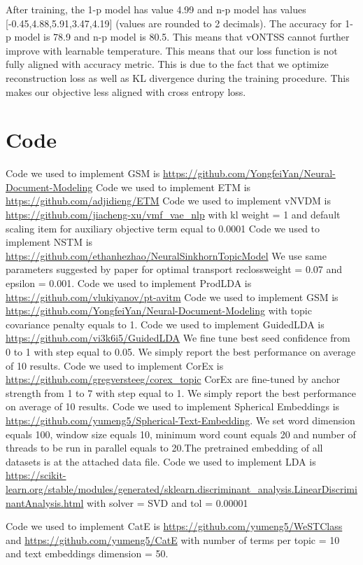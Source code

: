 \documentclass[11pt]{article}
\begin{document}
After training, the 1-p model has value 4.99 and n-p model has values [-0.45,4.88,5.91,3.47,4.19] (values are rounded to 2 decimals). The accuracy for 1-p model is 78.9 and n-p model is 80.5. This means that vONTSS cannot further improve with learnable temperature. This means that our loss function is not fully aligned with accuracy metric. This is due to the fact that we optimize reconstruction loss as well as KL divergence during the training procedure. This makes our objective less aligned with cross entropy loss.



\section{Code}
\label{appendix:code}
Code we used to implement GSM is \url{https://github.com/YongfeiYan/Neural-Document-Modeling}
Code we used to implement ETM is \url{https://github.com/adjidieng/ETM}
Code we used to implement vNVDM is \url{https://github.com/jiacheng-xu/vmf_vae_nlp} with kl weight = 1 and default scaling item for auxiliary objective term equal to 0.0001
Code we used to implement NSTM is \url{https://github.com/ethanhezhao/NeuralSinkhornTopicModel}
We use same parameters suggested by paper for optimal transport reclossweight = 0.07 and epsilon = 0.001. 
Code we used to implement ProdLDA is \url{https://github.com/vlukiyanov/pt-avitm}
Code we used to implement GSM is \url{https://github.com/YongfeiYan/Neural-Document-Modeling} with  topic covariance penalty equals to 1.
Code we used to implement GuidedLDA is \url{https://github.com/vi3k6i5/GuidedLDA} We fine tune best seed confidence from 0 to 1 with step equal to 0.05. We simply report the best performance on average of 10 results.
Code we used to implement CorEx is \url{https://github.com/gregversteeg/corex_topic}
CorEx are fine-tuned by anchor strength from 1 to 7 with step equal to 1. We simply report the best performance on average of 10 results.
Code we used to implement Spherical Embeddings is \url{https://github.com/yumeng5/Spherical-Text-Embedding}. We set word dimension equals 100, window size equals 10, minimum word count equals 20 and number of threads to be run in parallel equals to 20.The pretrained embedding of all datasets is at the attached data file.
Code we used to implement LDA is \url{https://scikit-learn.org/stable/modules/generated/sklearn.discriminant_analysis.LinearDiscriminantAnalysis.html} with solver = SVD and tol = 0.00001 

Code we used to implement CatE is \url{https://github.com/yumeng5/WeSTClass} and \url{https://github.com/yumeng5/CatE} with number of terms per topic = 10 and text embeddings dimension = 50.  
\end{document}
